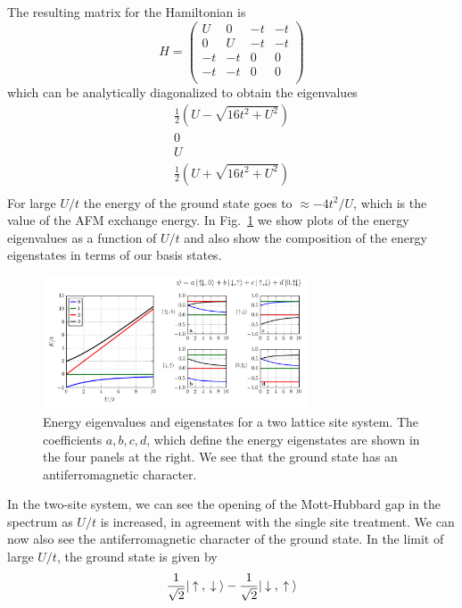 The resulting matrix for the Hamiltonian is 
\begin{equation}
H =   
\left(
\begin{array}{cccc}
 U & 0 & -t & -t \\
 0 & U & -t & -t \\
 -t & -t & 0 & 0 \\
 -t & -t & 0 & 0 \\
\end{array}
\right)  
\end{equation}
which can be analytically diagonalized to obtain the eigenvalues
\begin{equation}
\begin{array}{c}
 \frac{1}{2} \left(U-\sqrt{16 t^2+U^2}\right) \\
 0 \\
 U \\
 \frac{1}{2} \left(U+\sqrt{16 t^2+U^2}\right) \\
\end{array}
\end{equation}
For large $U/t$ the energy of the ground state goes to $\approx -4 t^{2}/U$,
which is the value of the AFM exchange energy.  In Fig.~\ref{fig:exact_2site}
we show plots of the energy eigenvalues as a function of $U/t$ and also show
the composition of the energy eigenstates in terms of our basis states.  
\begin{figure}
\centering
\includegraphics[width=0.7\textwidth]{../figures/hubbard/Ut_eigenvalues_2site.png}
\caption[Exact diagonalization results for two lattice sites.]{\small Energy
eigenvalues and eigenstates for a two lattice site system.  The coefficients
$a,b,c,d$, which define the energy eigenstates are shown in the four panels at
the right.  We see that the ground state has an antiferromagnetic character. } 
\label{fig:exact_2site}
\end{figure}
In the two-site system, we can see the opening of the Mott-Hubbard gap in the
spectrum as $U/t$ is increased, in agreement with the single site treatment.
We can now also see the antiferromagnetic character of the ground state.  In
the limit of large $U/t$, the ground state is given by 
\begin{equation}
    \frac{1}{\sqrt{2}} | \nspup, \nspdn\rangle  
  - \frac{1}{\sqrt{2}} | \nspdn, \nspup\rangle 
\end{equation} 



